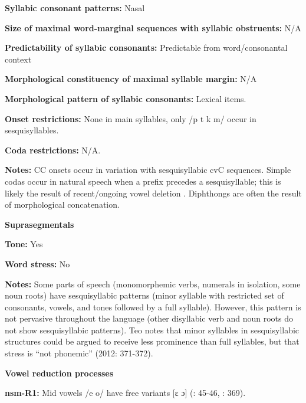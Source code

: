 \textbf{Syllabic consonant patterns:} Nasal



\textbf{Size of maximal word{}-marginal sequences with syllabic obstruents:} N/A



\textbf{Predictability of syllabic consonants:} Predictable from word/consonantal context



\textbf{Morphological constituency of maximal syllable margin:} N/A



\textbf{Morphological pattern of syllabic consonants:} Lexical items.



\textbf{Onset restrictions:} None in main syllables, only /p t k m/ occur in sesquisyllables.



\textbf{Coda restrictions:} N/A.



\textbf{Notes:} CC onsets occur in variation with sesquisyllabic cvC sequences. Simple codas occur in natural speech when a prefix precedes a sesquisyllable; this is likely the result of recent/ongoing vowel deletion \citep[62-4]{Teo2009}. Diphthongs are often the result of morphological concatenation.



\textbf{Suprasegmentals}



\textbf{Tone:} Yes



\textbf{Word stress:} No



\textbf{Notes:} Some parts of speech (monomorphemic verbs, numerals in isolation, some noun roots) have sesquisyllabic patterns  (minor syllable with restricted set of consonants, vowels, and tones followed by a full syllable). However, this pattern is not pervasive throughout the language (other disyllabic verb and noun roots do not show sesquisyllabic patterns). Teo notes that minor syllables in sesquisyllabic structures could be argued to receive less prominence than full syllables, but that stress is “not phonemic” (2012: 371-372).



\textbf{Vowel reduction processes}



\textbf{nsm-R1:} Mid vowels /e o/ have free variants [ɛ ɔ] (\citealt{Teo2009}: 45-46, \citealt{Teo2012}: 369).



